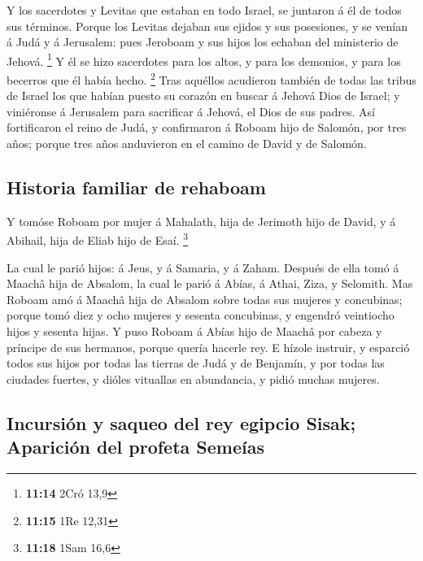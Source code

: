  Y los sacerdotes y Levitas que estaban en todo Israel, se
juntaron á él de todos sus términos.  Porque los Levitas
dejaban sus ejidos y sus posesiones, y se venían á Judá y á Jerusalem:
pues Jeroboam y sus hijos los echaban del ministerio de Jehová.
\footnote{\textbf{11:14} 2Cró 13,9}  Y él se hizo
sacerdotes para los altos, y para los demonios, y para los becerros que
él había hecho. \footnote{\textbf{11:15} 1Re 12,31}  Tras
aquéllos acudieron también de todas las tribus de Israel los que habían
puesto su corazón en buscar á Jehová Dios de Israel; y viniéronse á
Jerusalem para sacrificar á Jehová, el Dios de sus padres. 
Así fortificaron el reino de Judá, y confirmaron á Roboam hijo de
Salomón, por tres años; porque tres años anduvieron en el camino de
David y de Salomón.

\hypertarget{historia-familiar-de-rehaboam}{%
\subsection{Historia familiar de
rehaboam}\label{historia-familiar-de-rehaboam}}

 Y tomóse Roboam por mujer á Mahalath, hija de Jerimoth
hijo de David, y á Abihail, hija de Eliab hijo de Esaí. \footnote{\textbf{11:18}
  1Sam 16,6}

 La cual le parió hijos: á Jeus, y á Samaria, y á Zaham.
 Después de ella tomó á Maachâ hija de Absalom, la cual le
parió á Abías, á Athai, Ziza, y Selomith.  Mas Roboam amó á
Maachâ hija de Absalom sobre todas sus mujeres y concubinas; porque tomó
diez y ocho mujeres y sesenta concubinas, y engendró veintiocho hijos y
sesenta hijas.  Y puso Roboam á Abías hijo de Maachâ por
cabeza y príncipe de sus hermanos, porque quería hacerle rey.
 E hízole instruir, y esparció todos sus hijos por todas
las tierras de Judá y de Benjamín, y por todas las ciudades fuertes, y
dióles vituallas en abundancia, y pidió muchas mujeres.

\hypertarget{incursiuxf3n-y-saqueo-del-rey-egipcio-sisak-apariciuxf3n-del-profeta-semeuxedas}{%
\subsection{Incursión y saqueo del rey egipcio Sisak; Aparición del
profeta
Semeías}\label{incursiuxf3n-y-saqueo-del-rey-egipcio-sisak-apariciuxf3n-del-profeta-semeuxedas}}

